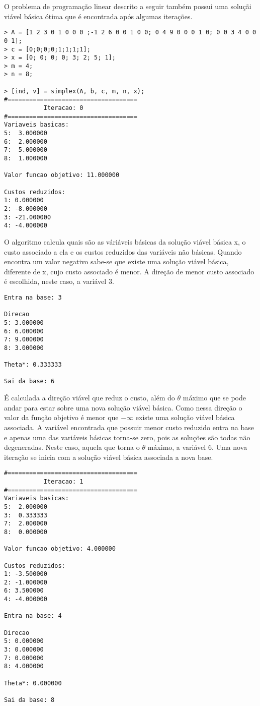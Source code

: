 \documentclass[
	12pt,				%
	openright,			%
	oneside,			%
	a4paper,			%
	english,			%
	french,				%
	spanish,			%
	brazil,				%
	]{abntex2}
\begin{document}
O problema de programação linear descrito a seguir também possui uma soluçãi viável básica ótima que é encontrada após algumas iterações.
\begin{verbatim}
> A = [1 2 3 0 1 0 0 0 ;-1 2 6 0 0 1 0 0; 0 4 9 0 0 0 1 0; 0 0 3 4 0 0 0 1];
> c = [0;0;0;0;1;1;1;1];
> x = [0; 0; 0; 0; 3; 2; 5; 1];
> m = 4;
> n = 8;

> [ind, v] = simplex(A, b, c, m, n, x);
#====================================
           Iteracao: 0
#====================================
Variaveis basicas:
5:  3.000000
6:  2.000000
7:  5.000000
8:  1.000000

Valor funcao objetivo: 11.000000

Custos reduzidos:
1: 0.000000
2: -8.000000
3: -21.000000
4: -4.000000
\end{verbatim}

O algoritmo calcula quais são as váriáveis básicas da solução viável básica x, o custo associado a ela e os custos reduzidos das variáveis não básicas. Quando encontra um valor negativo sabe-se que existe uma solução viável básica, diferente de x, cujo custo associado é menor. A direção de menor custo associado é escolhida, neste caso, a variável 3.

\begin{verbatim}
Entra na base: 3

Direcao
5: 3.000000
6: 6.000000
7: 9.000000
8: 3.000000

Theta*: 0.333333

Sai da base: 6
\end{verbatim}

É calculada a direção viável que reduz o custo, além do $\theta$ máximo que se pode andar para estar sobre uma nova solução viável básica. Como nessa direção o valor da função objetivo é menor que $-\infty$ existe uma solução viável básica associada. A variável encontrada que possuir menor custo reduzido entra na base e apenas uma das variáveis básicas torna-se zero, pois as soluções são todas não degeneradas. Neste caso, aquela que torna o $\theta$ máximo, a variável 6.
Uma nova iteração se inicia com a solução viável básica associada a nova base.

\begin{verbatim}
#====================================
           Iteracao: 1
#====================================
Variaveis basicas:
5:  2.000000
3:  0.333333
7:  2.000000
8:  0.000000

Valor funcao objetivo: 4.000000

Custos reduzidos:
1: -3.500000
2: -1.000000
6: 3.500000
4: -4.000000

Entra na base: 4

Direcao
5: 0.000000
3: 0.000000
7: 0.000000
8: 4.000000

Theta*: 0.000000

Sai da base: 8
\end{verbatim}
\end{document}
